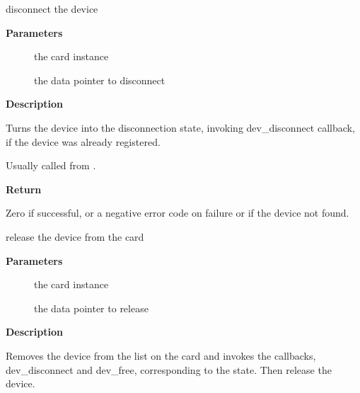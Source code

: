 \documentclass[a4paper,8pt,english]{sphinxmanual}
\begin{document}
\begin{fulllineitems}
\label{sound/kernel-api/alsa-driver-api:c.snd_device_disconnect}
disconnect the device

\end{fulllineitems}


\textbf{Parameters}
\begin{description}
\item[{}] \leavevmode
the card instance

\item[{}] \leavevmode
the data pointer to disconnect

\end{description}

\textbf{Description}

Turns the device into the disconnection state, invoking
dev\_disconnect callback, if the device was already registered.

Usually called from .

\textbf{Return}

Zero if successful, or a negative error code on failure or if the
device not found.

\begin{fulllineitems}
\label{sound/kernel-api/alsa-driver-api:c.snd_device_free}
release the device from the card

\end{fulllineitems}


\textbf{Parameters}
\begin{description}
\item[{}] \leavevmode
the card instance

\item[{}] \leavevmode
the data pointer to release

\end{description}

\textbf{Description}

Removes the device from the list on the card and invokes the
callbacks, dev\_disconnect and dev\_free, corresponding to the state.
Then release the device.
\end{document}
